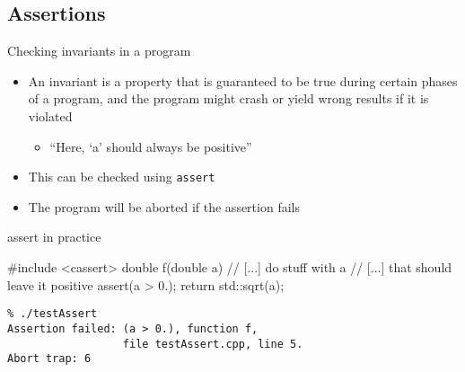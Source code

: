 \subsection[assert]{Assertions}

\begin{frame}[fragile]
  \begin{block}{Checking invariants in a program}
    \begin{itemize}
      \item An invariant is a property that is guaranteed to be true during certain phases of a program, and the program might crash or yield wrong results if it is violated
      \begin{itemize}
        \item ``Here, `a' should always be positive''
      \end{itemize}
      \item This can be checked using \texttt{assert}
      \item The program will be aborted if the assertion fails
    \end{itemize}
  \end{block}
  \begin{exampleblock}{assert in practice}
    \begin{overprint}
    \begin{cppcode*}{}
      #include <cassert>
      double f(double a) {
        // [...] do stuff with a
        // [...] that should leave it positive
        assert(a > 0.);
        return std::sqrt(a);
      }
    \end{cppcode*}
    \begin{Verbatim}
% ./testAssert
Assertion failed: (a > 0.), function f,
                  file testAssert.cpp, line 5.
Abort trap: 6
    \end{Verbatim}
    \end{overprint}
  \end{exampleblock}
\end{frame}


